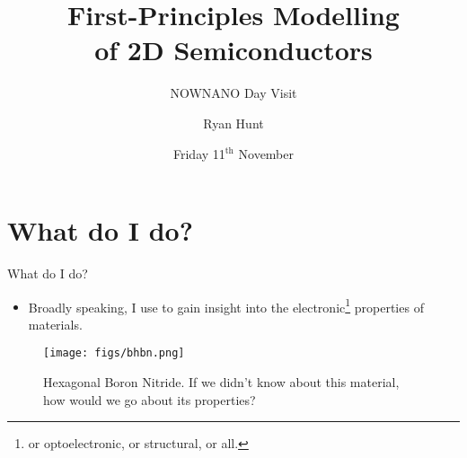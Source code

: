 \documentclass[12pt, pdf, hyperref={draft}, usenames, dvipsnames]{beamer}
\title{First-Principles Modelling \\
       of 2D Semiconductors}
\subtitle{NOWNANO Day Visit}
\author{Ryan Hunt}
\date{Friday 11$^{\text{th}}$ November}
\newcommand{\blue}[1]{{\bf\color{NavyBlue}{#1}}}
\newcommand{\green}[1]{{\bf\color{ForestGreen}{#1}}}
\begin{document}
\begin{frame}[plain]
  \titlepage
\end{frame}





\section{What do I do?}
\begin{frame}{What do I do?}
  \begin{itemize}
    \item Broadly speaking, I use \green{advanced} \blue{electronic structure
    methods} to gain insight into the electronic\footnote{or optoelectronic, or
    structural, or all.} properties of materials.
  \end{itemize}
  \begin{figure}[H]
    \centering
    \texttt{[image: figs/bhbn.png]}
    \caption{Hexagonal Boron Nitride. If we didn't know about this material,
    how would we go about \blue{determining} its properties?}
    \label{fig:bhbn}
  \end{figure}
\end{frame}

\end{document}
